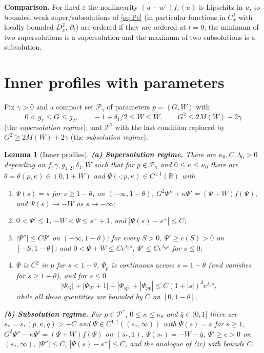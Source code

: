 \documentclass[11pt]{amsart}
\newtheorem{lemma}[theorem]{Lemma}
\theoremstyle{definition}
\theoremstyle{remark}
\newcommand{\ve}{\varepsilon}
\newcommand{\R}{\mathbb{R}}
\begin{document}
\textbf{Comparison.} For fixed $\ve$ the nonlinearity $(u+w^\ve)f_\ve(u)$ is
Lipschitz in $u$, so bounded weak super/subsolutions of \eqref{eq:Pe} (in
particular functions in $C^1_x$ with locally bounded $D^2_x$, $\partial_t$) are
ordered if they are ordered at $t=0$; the minimum of two supersolutions is a
supersolution and the maximum of two subsolutions is a subsolution.

\section{Inner profiles with parameters}

Fix $\gamma>0$ and a compact set $\mathcal P_\gamma$ of parameters $p=(G,W)$ with
\[
0<g_1\le G\le g_2,\qquad -1+\delta_1/2\le W\le \bar W,\qquad G^2\le 2M(W)-2\gamma
\]
(the \emph{supersolution regime}); and $\mathcal P^\gamma$ with the last
condition replaced by $G^2\ge2M(W)+2\gamma$ (the \emph{subsolution regime}).

\begin{lemma}[Inner profiles]\label{lem:inner}
\textbf{(a) Supersolution regime.} There are $\kappa_0,C,\lambda_0>0$ depending on
$f,\gamma,g_{1,2},\delta_1,\bar W$ such that for $p\in\mathcal P_\gamma$ and
$0\le\kappa\le\kappa_0$ there are $\theta=\theta(p,\kappa)\in(0,1+W)$ and
$\Psi(\cdot;p,\kappa)\in C^{1,1}(\R)$ with
\begin{enumerate}
\item[(i)] $\Psi(s)=s$ for $s\ge1-\theta$; on $(-\infty,1-\theta)$,
$G^2\Psi''+\kappa\Psi'=(\Psi+W)f(\Psi)$, and $\Psi(s)\to-W$ as $s\to-\infty$;
\item[(ii)] $0<\Psi'\le1$, $-W<\Psi\le s^++1$, and $|\Psi(s)-s^+|\le C$;
\item[(iii)] $|\Psi''|\le C\Psi'$ on $(-\infty,1-\theta)$; for every $S>0$,
$\Psi'\ge c(S)>0$ on $[-S,1-\theta]$; and $0<\Psi+W\le Ce^{\lambda_0s}$,
$\Psi'\le Ce^{\lambda_0 s}$ for $s\le0$;
\item[(iv)] $\Psi$ is $C^2$ in $p$ for $s<1-\theta$, $\Psi_p$ is continuous across
$s=1-\theta$ (and vanishes for $s\ge1-\theta$), and for $s\le0$
\[
|\Psi_G|+|\Psi_W+1|+|\Psi_{sp}|+|\Psi_{pp}|\le C(1+|s|)^2e^{\lambda_0 s},
\]
while all these quantities are bounded by $C$ on $[0,1-\theta]$.
\end{enumerate}
\textbf{(b) Subsolution regime.} For $p\in\mathcal P^\gamma$, $0\le\kappa\le\kappa_0$ and
$\bar q\in(0,1]$ there are $s_*=s_*(p,\kappa,\bar q)>-C$ and
$\Psi\in C^{1,1}((s_*,\infty))$ with $\Psi(s)=s$ for $s\ge1$,
$G^2\Psi''-\kappa\Psi'=(\Psi+W)f(\Psi)$ on $(s_*,1)$, $\Psi(s_*)=-W-\bar q$,
$\Psi'\ge c>0$ on $(s_*,\infty)$, $|\Psi''|\le C$, $|\Psi(s)-s^+|\le C$, and the
analogue of (iv) with bounds $C$.
\end{lemma}
\end{document}
